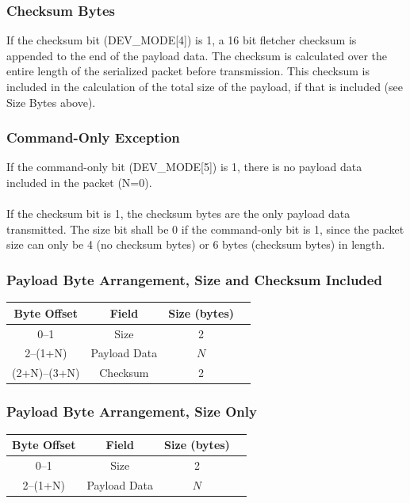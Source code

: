 \documentclass{article}
\begin{document}
    \subsubsection{Checksum Bytes}
    If the checksum bit (DEV\_MODE[4]) is 1, a 16 bit fletcher checksum is appended to the end of the payload data. The checksum is calculated over the entire length of the serialized packet before transmission. This checksum is included in the calculation of the total size of the payload, if that is included (see Size Bytes above).

    \subsubsection{Command-Only Exception}
    If the command-only bit (DEV\_MODE[5]) is 1, there is no payload data included in the packet (N=0).\\
    \\
    If the checksum bit is 1, the checksum bytes are the only payload data transmitted. The size bit shall be 0 if the command-only bit is 1, since the packet size can only be 4 (no checksum bytes) or 6 bytes (checksum bytes) in length.

    \subsubsection{Payload Byte Arrangement, Size and Checksum Included}
    
    \begin{center}
    \begin{tabular}{|c|c|c|c|}
    \hline
    \textbf{Byte Offset} & \textbf{Field} & \textbf{Size (bytes)} \\
    \hline
    0--1 & Size & 2\\
    \hline
    2--(1+N) & Payload Data & $N$ \\
    \hline
    (2+N)--(3+N) & Checksum & 2\\
    \hline
    \end{tabular}
    \end{center}

    \subsubsection{Payload Byte Arrangement, Size Only}
    
    \begin{center}
    \begin{tabular}{|c|c|c|c|}
    \hline
    \textbf{Byte Offset} & \textbf{Field} & \textbf{Size (bytes)} \\
    \hline
    0--1 & Size & 2\\
    \hline
    2--(1+N) & Payload Data & $N$ \\
    \hline
    \end{tabular}
    \end{center}
\end{document}
